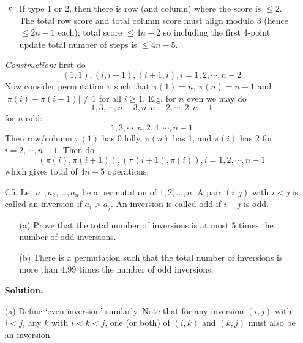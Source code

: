 \documentclass[11pt,a4paper]{article}
\begin{document}
\begin{enumerate}
\begin{itemize}
    		\item If type 1 or 2, then there is row (and column) where the score is $\le 2$. 
    		The total row score and total column score must align modulo 3 (hence $\le 2n-1$ each); total score $\le 4n-2$ so including the first 4-point update total number of steps is $\le 4n-5$. 
    	\end{itemize}
    	
    	\textit{Construction:} first do 
    	\[
    	(1, 1), (i, i+1), (i+1, i), i=1, 2, \cdots, n-2
    	\]
    	Now consider permutation $\pi$ such that $\pi(1)=n$, $\pi(n)=n-1$
    	and $|\pi(i)-\pi(i+1)|\neq 1$ for all $i\ge 1$. 
    	E.g. for $n$ even we may do 
    	\[
    	1, 3, \cdots, n - 3, n, n - 2, \cdots, 2, n - 1
    	\]
    	for $n$ odd: 
    	\[
    	1, 3, \cdots, n, 2, 4, \cdots, n-1
    	\]
    	Then row/column $\pi(1)$ has 0 lolly, $\pi(n)$ has 1, and $\pi(i)$ has 2 for $i=2, \cdots, n-1$. 
    	Then do 
    	\[
    	(\pi(i), \pi(i+1)), (\pi(i+1), \pi(i)), i=1, 2, \cdots, n-1
    	\]
    	which gives total of $4n-5$ operations. 
    	
    	\item [C5.]
    	Let $a_1,a_2,\dots,a_n$ be a permutation of $1,2,\dots,n$. A pair $(i,j)$ with $i<j$ is called an inversion if $a_i>a_j$. An inversion is called odd if $i-j$ is odd.
    	
    	\begin{enumerate}
    		\item[(a)] Prove that the total number of inversions is at most $5$ times the number of odd inversions.
    		
    		\item [(b)]There is a permutation such that the total number of inversions is more than $4.99$ times the number of odd inversions.
    	\end{enumerate}
        
        \textbf{Solution.} 
        
        (a)
        Define `even inversion' similarly. 
        Note that for any inversion $(i, j)$ with $i < j$, 
        any $k$ with $i < k < j$, one (or both) of $(i, k)$ and $(k, j)$ must also be an inversion. 
        

\end{enumerate}
\end{document}
